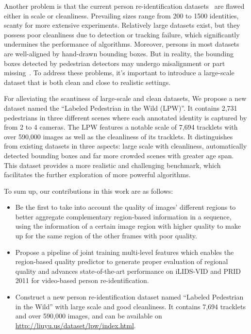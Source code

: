 \documentclass[letterpaper]{article} %
\begin{document}
Another problem is that the current person re-identification datasets~\cite{wang2014person,hirzer2011person,li2014deepreid,zheng2015scalable} are flawed either in scale or cleanliness. Prevailing sizes range from 200 to 1500 identities, scanty for more extensive experiments. Relatively large datasets exist, but they possess poor cleanliness due to detection or tracking failure, which significantly undermines the performance of algorithms. Moreover, persons in most datasets are well-aligned by hand-drawn bounding boxes. But in reality, the bounding boxes detected by pedestrian detectors may undergo misalignment or part missing~\cite{zheng2015scalable}. To address these problems, it's important to introduce a large-scale dataset that is both clean and close to realistic settings.

For alleviating the scantiness of large-scale and clean datasets, We propose a new dataset named the ``Labeled Pedestrian in the Wild (LPW)''. It contains 2,731 pedestrians in three different scenes where each annotated identity is captured by from 2 to 4 cameras. The LPW features a notable scale of 7,694 tracklets with over 590,000 images as well as the cleanliness of its tracklets. It distinguishes from existing
datasets in three aspects: large scale with cleanliness, automatically detected bounding boxes and far more crowded scenes with greater age span. This dataset provides a more realistic and challenging benchmark, which facilitates the further exploration of more powerful algorithms.

To sum up, our contributions in this work are as follows:
\begin{itemize}
\item Be the first to take into account the quality of images' different regions to better aggregate complementary region-based information in a sequence, using the information of a certain image region with higher quality to make up for the same region of the other frames with poor quality.
\item Propose a pipeline of joint training multi-level features which enables the region-based quality predictor to generate proper evaluation of regional quality and advances state-of-the-art performance on iLIDS-VID and PRID 2011 for video-based person re-identification.
\item Construct a new person re-identification dataset named ``Labeled Pedestrian in the Wild'' with large scale and good cleanliness. It contains 7,694 tracklets and over
590,000 images, and can be available on \url{http://liuyu.us/dataset/lpw/index.html}.
\end{itemize}
\end{document}

